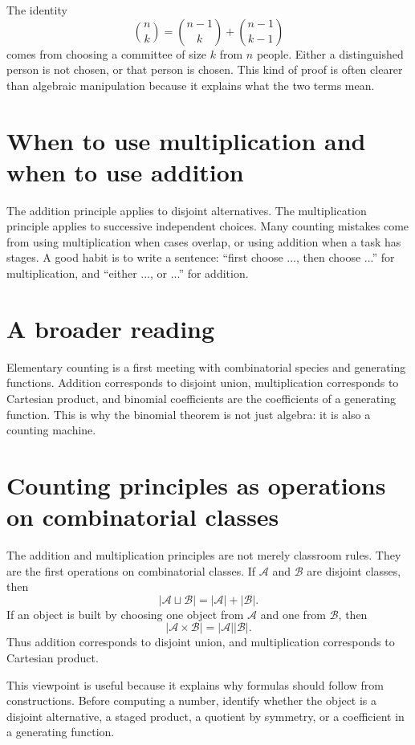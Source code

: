 The identity
\[
  \binom n k=\binom{n-1}k+\binom{n-1}{k-1}
\]
comes from choosing a committee of size \(k\) from \(n\) people.  Either a distinguished person is not chosen, or that person is chosen.  This kind of proof is often clearer than algebraic manipulation because it explains what the two terms mean.

\section{When to use multiplication and when to use addition}

The addition principle applies to disjoint alternatives.  The multiplication principle applies to successive independent choices.  Many counting mistakes come from using multiplication when cases overlap, or using addition when a task has stages.  A good habit is to write a sentence: ``first choose ..., then choose ...'' for multiplication, and ``either ..., or ...'' for addition.

\section{A broader reading}

Elementary counting is a first meeting with combinatorial species and generating functions.  Addition corresponds to disjoint union, multiplication corresponds to Cartesian product, and binomial coefficients are the coefficients of a generating function.  This is why the binomial theorem is not just algebra: it is also a counting machine.

\section{Counting principles as operations on combinatorial classes}

The addition and multiplication principles are not merely classroom rules.  They are the first operations on combinatorial classes.  If \(\mathcal A\) and \(\mathcal B\) are disjoint classes, then
\[
  |\mathcal A\sqcup\mathcal B|=|\mathcal A|+|\mathcal B|.
\]
If an object is built by choosing one object from \(\mathcal A\) and one from \(\mathcal B\), then
\[
  |\mathcal A\times\mathcal B|=|\mathcal A||\mathcal B|.
\]
Thus addition corresponds to disjoint union, and multiplication corresponds to Cartesian product.

This viewpoint is useful because it explains why formulas should follow from constructions.  Before computing a number, identify whether the object is a disjoint alternative, a staged product, a quotient by symmetry, or a coefficient in a generating function.

